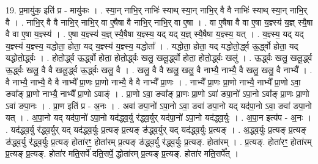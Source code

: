 \documentclass[17pt]{extarticle}
\begin{document}
19. प्र॒मायु॑क॒ इति॑ प्र - मायु॑कः । . स्या॒न् नाभि॒र् नाभिः॑ स्याथ् स्या॒न् नाभि॒र् वै वै नाभिः॑ स्याथ् स्या॒न् नाभि॒र् वै । . नाभि॒र् वै वै नाभि॒र् नाभि॒र् वा ए॒षैषा वै नाभि॒र् नाभि॒र् वा ए॒षा । . वा ए॒षैषा वै वा ए॒षा य॒ज्ञ्स्य॑ य॒ज्ञ् स्यै॒षा वै वा ए॒षा य॒ज्ञ्स्य॑ । . ए॒षा य॒ज्ञ्स्य॑ य॒ज्ञ् स्यै॒षैषा य॒ज्ञ्स्य॒ यद् यद् य॒ज्ञ् स्यै॒षैषा य॒ज्ञ्स्य॒ यत् । . य॒ज्ञ्स्य॒ यद् यद् य॒ज्ञ्स्य॑ य॒ज्ञ्स्य॒ यद्धोता॒ होता॒ यद् य॒ज्ञ्स्य॑ य॒ज्ञ्स्य॒ यद्धोता᳚ । . यद्धोता॒ होता॒ यद् यद्धोतो॒र्द्ध्व ऊ॒र्द्ध्वो होता॒ यद् यद्धोतो॒र्द्ध्वः । . होतो॒र्द्ध्व ऊ॒र्द्ध्वो होता॒ होतो॒र्द्ध्वः खलु॒ खलू॒र्द्ध्वो होता॒ होतो॒र्द्ध्वः खलु॑ । . ऊ॒र्द्ध्वः खलु॒ खलू॒र्द्ध्व ऊ॒र्द्ध्वः खलु॒ वै वै खलू॒र्द्ध्व ऊ॒र्द्ध्वः खलु॒ वै । . खलु॒ वै वै खलु॒ खलु॒ वै नाभ्यै॒ नाभ्यै॒ वै खलु॒ खलु॒ वै नाभ्यै᳚ । . वै नाभ्यै॒ नाभ्यै॒ वै वै नाभ्यै᳚ प्रा॒णः प्रा॒णो नाभ्यै॒ वै वै नाभ्यै᳚ प्रा॒णः । . नाभ्यै᳚ प्रा॒णः प्रा॒णो नाभ्यै॒ नाभ्यै᳚ प्रा॒णो ऽवा॒ ङवा᳚ङ् प्रा॒णो नाभ्यै॒ नाभ्यै᳚ प्रा॒णो ऽवाङ्॑ । . प्रा॒णो ऽवा॒ ङवा᳚ङ् प्रा॒णः प्रा॒णो ऽवा॑ ङपा॒नो॑ ऽपा॒नो ऽवा᳚ङ् प्रा॒णः प्रा॒णो ऽवा॑ ङपा॒नः । . प्रा॒ण इति॑ प्र - अ॒नः । . अवा॑ ङपा॒नो॑ ऽपा॒नो ऽवा॒ ङवा॑ ङपा॒नो यद् यद॑पा॒नो ऽवा॒ ङवा॑ ङपा॒नो यत् । . अ॒पा॒नो यद् यद॑पा॒नो॑ ऽपा॒नो यद॑द्ध्व॒र्यु र॑द्ध्व॒र्युर् यद॑पा॒नो॑ ऽपा॒नो यद॑द्ध्व॒र्युः । . अ॒पा॒न इत्य॑प - अ॒नः । . यद॑द्ध्व॒र्यु र॑द्ध्व॒र्युर् यद् यद॑द्ध्व॒र्युः प्र॒त्यङ् प्र॒त्यङ् ङ॑द्ध्व॒र्युर् यद् यद॑द्ध्व॒र्युः प्र॒त्यङ् । . अ॒द्ध्व॒र्युः प्र॒त्यङ् प्र॒त्यङ् ङ॑द्ध्व॒र्यु र॑द्ध्व॒र्युः प्र॒त्यङ् होता॑रꣳ॒॒ होता॑रम् प्र॒त्यङ् ङ॑द्ध्व॒र्यु र॑द्ध्व॒र्युः प्र॒त्यङ्. होता॑रम् । . प्र॒त्यङ्. होता॑रꣳ॒॒ होता॑रम् प्र॒त्यङ् प्र॒त्यङ्. होता॑र मति॒सर्पे॑ दति॒सर्पे॒ द्धोता॑रम् प्र॒त्यङ् प्र॒त्यङ्. होता॑र मति॒सर्पे᳚त् । \newline
\end{document}
